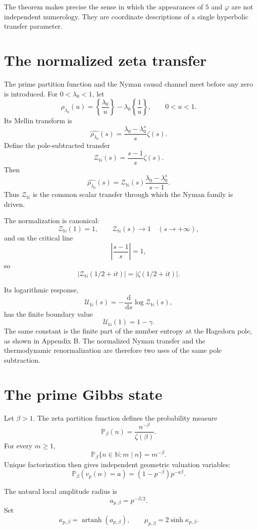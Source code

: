 \documentclass[11pt]{article}
\theoremstyle{definition}
\theoremstyle{remark}
\DeclareMathOperator{\artanh}{artanh}
\newcommand{\N}{\mathbb N}
\newcommand{\dd}{\,\mathrm d}
\begin{document}
The theorem makes precise the sense in which the appearances of \(5\) and \(\varphi\) are not independent numerology.  They are coordinate descriptions of a single hyperbolic transfer parameter.

\section{The normalized zeta transfer}

The prime partition function and the Nyman causal channel meet before any zero is introduced.  For \(0<\lambda_0<1\), let
\[
\rho_{\lambda_0}(u)
=
\left\{\frac{\lambda_0}{u}\right\}
-
\lambda_0\left\{\frac1u\right\},
\qquad 0<u<1.
\]
Its Mellin transform is
\[
\widehat{\rho_{\lambda_0}}(s)
=
\frac{\lambda_0-\lambda_0^s}{s}\zeta(s).
\]
Define the pole-subtracted transfer
\[
\boxed{
\mathcal Z_{\mathbb N}(s)
=
\frac{s-1}{s}\zeta(s).
}
\]
Then
\[
\boxed{
\widehat{\rho_{\lambda_0}}(s)
=
\mathcal Z_{\mathbb N}(s)
\frac{\lambda_0-\lambda_0^s}{s-1}.
}
\]
Thus \(\mathcal Z_{\mathbb N}\) is the common scalar transfer through which the Nyman family is driven.

The normalization is canonical:
\[
\mathcal Z_{\mathbb N}(1)=1,
\qquad
\mathcal Z_{\mathbb N}(s)\longrightarrow1
\quad(s\to+\infty),
\]
and on the critical line
\[
\left|\frac{s-1}{s}\right|=1,
\]
so
\[
|\mathcal Z_{\mathbb N}(1/2+it)|
=
|\zeta(1/2+it)|.
\]

Its logarithmic response,
\[
\mathcal U_{\mathbb N}(s)
=
-\frac{\dd}{\dd s}\log\mathcal Z_{\mathbb N}(s),
\]
has the finite boundary value
\[
\boxed{
\mathcal U_{\mathbb N}(1)=1-\gamma.
}
\]
The same constant is the finite part of the number entropy at the Hagedorn pole, as shown in Appendix B.  The normalized Nyman transfer and the thermodynamic renormalization are therefore two uses of the same pole subtraction.

\section{The prime Gibbs state}

Let \(\beta>1\).  The zeta partition function defines the probability measure
\[
\boxed{
\mathbb P_\beta(n)
=
\frac{n^{-\beta}}{\zeta(\beta)}.
}
\]
For every \(m\ge1\),
\[
\mathbb P_\beta\{n\in\N:m\mid n\}=m^{-\beta}.
\]
Unique factorization then gives independent geometric valuation variables:
\[
\boxed{
\mathbb P_\beta(v_p(n)=a)
=
(1-p^{-\beta})p^{-a\beta}.
}
\]

The natural local amplitude radius is
\[
a_{p,\beta}=p^{-\beta/2}.
\]
Set
\[
\kappa_{p,\beta}=\artanh(a_{p,\beta}),
\qquad
\mu_{p,\beta}=2\sinh\kappa_{p,\beta}.
\]
\end{document}
